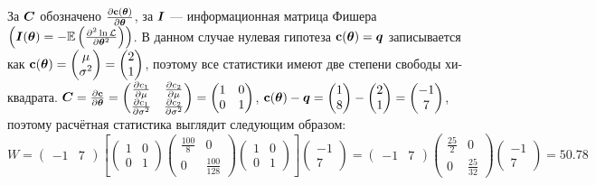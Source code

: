 \begin{problem}
\begin{sol}
\begin{enumerate}
За $\boldsymbol{C}$ обозначено $\frac{\partial \mathbf{c}(\boldsymbol{\theta})}{\partial \boldsymbol{\theta}}$, за $\boldsymbol{I}$ — информационная матрица Фишера $\left(\boldsymbol{I}(\boldsymbol{\theta}) = -\mathbb{E}\left(\frac{\partial^2 \ln \mathcal{L}}{\partial \boldsymbol{\theta}^2} \right)\right)$.
В данном случае нулевая гипотеза $\mathbf{c}(\boldsymbol{\theta}) = \boldsymbol{q}$ записывается как $\mathbf{c}({\boldsymbol{\theta}}) = \begin{pmatrix} \mu \\ \sigma^2 \end{pmatrix} = \begin{pmatrix} 2 \\ 1 \end{pmatrix}$, поэтому все статистики имеют две степени свободы хи-квадрата.
$\boldsymbol{C} = \frac{\partial  \mathbf{c}}{\partial \boldsymbol{\theta}} = \begin{pmatrix} \frac{\partial  c_1}{\partial \mu} & \frac{\partial  c_2}{\partial \mu} \\ \frac{\partial  c_1}{\partial \sigma^2} & \frac{\partial  c_2}{\partial \sigma^2} \end{pmatrix} =  \begin{pmatrix} 1 & 0 \\ 0 & 1 \end{pmatrix}$,
$\mathbf{c}(\boldsymbol{\theta}) - \boldsymbol{q}  = \begin{pmatrix} 1 \\ 8 \end{pmatrix} - \begin{pmatrix} 2 \\ 1 \end{pmatrix} = \begin{pmatrix} -1 \\ 7 \end{pmatrix}$, поэтому расчётная статистика выглядит следующим образом:
\[
W = \begin{pmatrix} -1 & 7 \end{pmatrix} \left[ \begin{pmatrix} 1 & 0 \\ 0 & 1 \end{pmatrix} \begin{pmatrix} \frac{100}{8} & 0 \\ 0 & \frac{100}{128}  \end{pmatrix} \begin{pmatrix} 1 & 0 \\ 0 & 1 \end{pmatrix} \right] \begin{pmatrix} -1  \\  7 \end{pmatrix} =
\begin{pmatrix} -1 & 7 \end{pmatrix} \begin{pmatrix} \frac{25}{2} & 0 \\ 0 & \frac{25}{32} \end{pmatrix} \begin{pmatrix} -1  \\  7 \end{pmatrix} = 50.78
\]


\end{enumerate}
\end{sol}
\end{problem}
